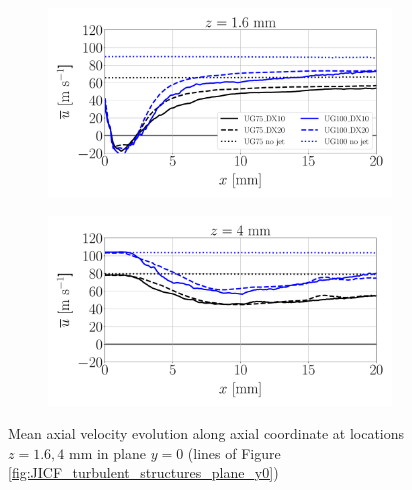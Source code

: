 \begin{figure}[ht]
\flushleft
\begin{subfigure}[b]{0.45\textwidth}
	\centering
   \includegraphics[scale=0.22]{./part2_developments/figures_ch5_resolved_JICF/turbulent_structures/line_y0_along_x_z01p6}
\end{subfigure}
\hspace{0.4in}
\begin{subfigure}[b]{0.45\textwidth}
	\centering
   \includegraphics[scale=0.22]{./part2_developments/figures_ch5_resolved_JICF/turbulent_structures/line_y0_along_x_z04}
\end{subfigure}
\caption{Mean axial velocity evolution along axial coordinate at locations $z = 1.6, 4$ mm in plane $y = 0$ (lines of Figure \ref{fig:JICF_turbulent_structures_plane_y0})}
\label{fig:JICF_sps_lines_y0_along_x_ux_mean}
\end{figure}


\clearpage


